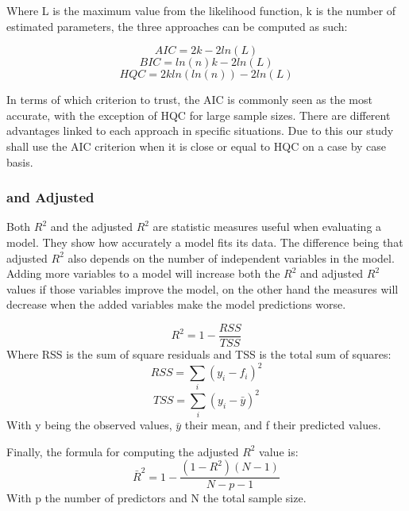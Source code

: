 Where L is the maximum value from the likelihood function, k is the number of estimated parameters, the three approaches can be computed as such:

\begin{equation}
    AIC = 2k - 2ln(L)
\end{equation}
\begin{equation}
    BIC = ln(n)k - 2ln(L)
\end{equation}
\begin{equation}
    HQC = 2kln(ln(n)) - 2ln(L)
\end{equation}


In terms of which criterion to trust, the AIC is commonly seen as the most accurate, with the exception of HQC for large sample sizes. There are different advantages linked to each approach in specific situations. Due to this our study shall use the AIC criterion when it is close or equal to HQC on a case by case basis.

\subsubsection{ and Adjusted }

Both $R^2$ and the adjusted $R^2$ are statistic measures useful when evaluating a model. They show how accurately a model fits its data. The difference being that adjusted $R^2$ also depends on the number of independent variables in the model. Adding more variables to a model will increase both the $R^2$ and adjusted $R^2$ values if those variables improve the model, on the other hand the measures will decrease when the added variables make the model predictions worse.

\begin{equation}
    R^2 = 1 - \frac{RSS}{TSS}
\end{equation}
Where RSS is the sum of square residuals and TSS is the total sum of squares:
\begin{equation*}
    RSS = \sum_{i} (y_{i} - f_{i})^2
\end{equation*}
\begin{equation*}
    TSS = \sum_{i}(y_{i} - \bar{y})^{2}
\end{equation*}
With y being the observed values, $\bar{y}$ their mean, and f their predicted values.

Finally, the formula for computing the adjusted $R^2$ value is:
\begin{equation}
    \bar{R}^{2} = 1 - \frac{(1 - R^2)(N - 1)}{N - p - 1}
\end{equation}
With p the number of predictors and N the total sample size.


